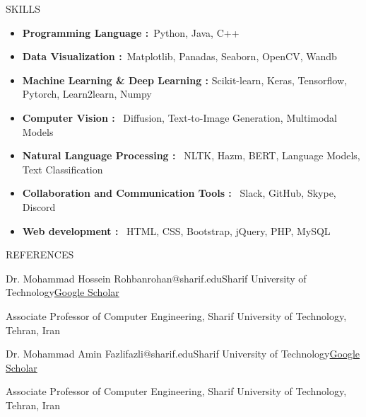 \documentclass[]{CV}
\begin{document}
\vspace{-6mm}
\begin{section}{SKILLS}
    \begin{itemize}
        \item \textbf{Programming Language :}~Python, Java, C++
        \item \textbf{Data Visualization :}~Matplotlib, Panadas, Seaborn, OpenCV, Wandb
        \item \textbf{Machine Learning \& Deep Learning :} Scikit-learn, Keras, Tensorflow, Pytorch, Learn2learn, Numpy
        \item \textbf{Computer Vision :}~ Diffusion, Text-to-Image Generation, Multimodal Models
        \item \textbf{Natural Language Processing :}~ NLTK, Hazm, BERT, Language Models, Text Classification
        \item \textbf{Collaboration and Communication Tools : }~Slack, GitHub, Skype, Discord
	\item \textbf{Web development :}~ HTML, CSS, Bootstrap, jQuery, PHP,  MySQL
    \end{itemize} 
\end{section}

\begin{section}{REFERENCES}
\begin{subsectionnobullet}{Dr. Mohammad Hossein Rohban}{rohan@sharif.edu}{Sharif University of Technology}{\href{https://scholar.google.com/citations?user=pRyJ6FkAAAAJ&hl=en}{Google Scholar}}
    \item {Associate Professor of Computer Engineering, Sharif University of Technology, Tehran, Iran}
\end{subsectionnobullet}

\begin{subsectionnobullet}{Dr. Mohammad Amin Fazli}{fazli@sharif.edu}{Sharif University of Technology}{\href{https://scholar.google.com/citations?user=veo-8swAAAAJ&hl=en}{Google Scholar}}
    \item {Associate Professor of Computer Engineering, Sharif University of Technology, Tehran, Iran}
\end{subsectionnobullet}

\end{section}
\end{document}
